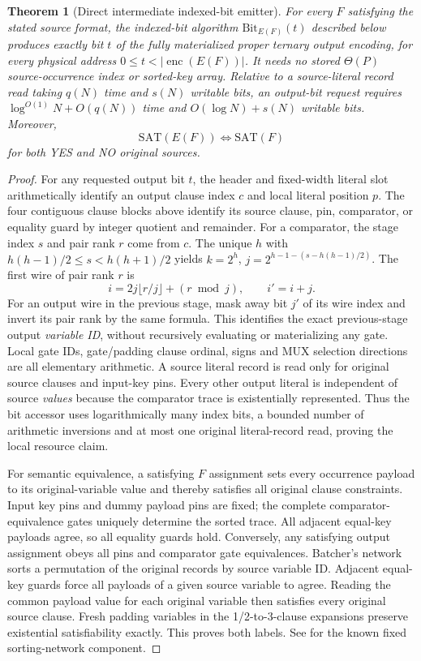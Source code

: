 \documentclass[11pt]{article}
\newtheorem{theorem}{Theorem}
\begin{document}
\begin{theorem}[Direct intermediate indexed-bit emitter]
For every $F$ satisfying the stated source format, the indexed-bit algorithm
$\mathrm{Bit}_{E(F)}(t)$ described below produces exactly bit $t$ of the
fully materialized proper ternary output encoding, for every physical
address $0\le t<|\operatorname{enc}(E(F))|$. It needs no stored
$\Theta(P)$ source-occurrence index or sorted-key array. Relative to a
source-literal record read taking $q(N)$ time and $s(N)$ writable bits, an
output-bit request requires $\log^{O(1)}N+O(q(N))$ time and
$O(\log N)+s(N)$ writable bits. Moreover,
\[
 \mathrm{SAT}(E(F))\iff\mathrm{SAT}(F)
\]
for both YES and NO original sources.
\end{theorem}
\begin{proof}
For any requested output bit $t$, the header and fixed-width literal slot
arithmetically identify an output clause index $c$ and local literal
position $p$. The four contiguous clause blocks above identify its source
clause, pin, comparator, or equality guard by integer quotient and
remainder. For a comparator, the stage index $s$ and pair rank $r$ come
from $c$. The unique $h$ with
$h(h-1)/2\le s<h(h+1)/2$ yields
$k=2^h$, $j=2^{h-1-(s-h(h-1)/2)}$. The first wire of pair rank $r$ is
\[
 i=2j\lfloor r/j\rfloor+(r\bmod j),
 \qquad i'=i+j.
\]
For an output wire in the previous stage, mask away bit $j'$ of its wire
index and invert its pair rank by the same formula. This identifies the
exact previous-stage output \emph{variable ID}, without recursively
evaluating or materializing any gate. Local gate IDs, gate/padding clause
ordinal, signs and MUX selection directions are all elementary arithmetic.
A source literal record is read only for original source clauses and
input-key pins. Every other output literal is independent of source
\emph{values} because the comparator trace is existentially represented.
Thus the bit accessor uses logarithmically many index bits, a bounded
number of arithmetic inversions and at most one original literal-record
read, proving the local resource claim.

For semantic equivalence, a satisfying $F$ assignment sets every occurrence
payload to its original-variable value and thereby satisfies all original
clause constraints. Input key pins and dummy payload pins are fixed; the
complete comparator-equivalence gates uniquely determine the sorted trace.
All adjacent equal-key payloads agree, so all equality guards hold.
Conversely, any satisfying output assignment obeys all pins and comparator
gate equivalences. Batcher's network sorts a permutation of the original
records by source variable ID. Adjacent equal-key guards force all payloads
of a given source variable to agree. Reading the common payload value for
each original variable then satisfies every original source clause.
Fresh padding variables in the 1/2-to-3-clause expansions preserve
existential satisfiability exactly. This proves both labels. See
\cite{batcher1968} for the known fixed sorting-network component.
\end{proof}
\end{document}

